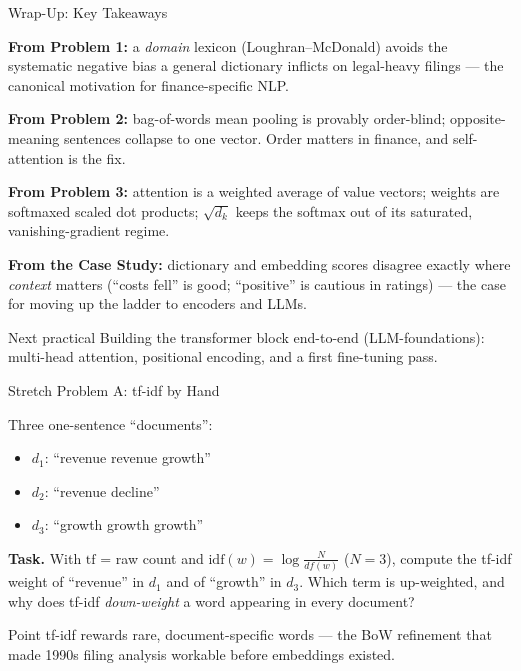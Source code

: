 \documentclass[9pt,t]{beamer}
\begin{document}
\begin{frame}{Wrap-Up: Key Takeaways}

\textbf{From Problem 1:} a \emph{domain} lexicon (Loughran--McDonald) avoids the
systematic negative bias a general dictionary inflicts on legal-heavy filings ---
the canonical motivation for finance-specific NLP.

\medskip
\textbf{From Problem 2:} bag-of-words mean pooling is provably order-blind;
opposite-meaning sentences collapse to one vector. Order matters in finance, and
self-attention is the fix.

\medskip
\textbf{From Problem 3:} attention is a weighted average of value vectors; weights
are softmaxed scaled dot products; $\sqrt{d_k}$ keeps the softmax out of its
saturated, vanishing-gradient regime.

\medskip
\textbf{From the Case Study:} dictionary and embedding scores disagree exactly
where \emph{context} matters (``costs fell'' is good; ``positive'' is cautious in
ratings) --- the case for moving up the ladder to encoders and LLMs.

\medskip
\begin{block}{Next practical}
Building the transformer block end-to-end (LLM-foundations): multi-head
attention, positional encoding, and a first fine-tuning pass.
\end{block}
\end{frame}


\begin{frame}[noframenumbering]{Stretch Problem A: tf-idf by Hand}

Three one-sentence ``documents'':
\begin{itemize}
  \item $d_1$: ``revenue revenue growth''
  \item $d_2$: ``revenue decline''
  \item $d_3$: ``growth growth growth''
\end{itemize}

\medskip
\textbf{Task.} With $\mathrm{tf}$ = raw count and
$\mathrm{idf}(w)=\log\frac{N}{df(w)}$ ($N=3$), compute the tf-idf weight of
``revenue'' in $d_1$ and of ``growth'' in $d_3$. Which term is up-weighted, and why
does tf-idf \emph{down-weight} a word appearing in every document?

\medskip
\begin{block}{Point}
tf-idf rewards rare, document-specific words --- the BoW refinement that made
1990s filing analysis workable before embeddings existed.
\end{block}
\end{frame}
\end{document}
